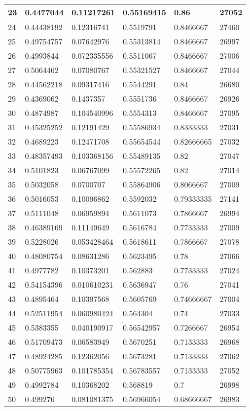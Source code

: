 \begin{longtable}{|l|l|l|l|l|l|}
23 & 0.4477044 & 0.11217261 & 0.55169415 & 0.86 & 27052 \\ \hline 
24 & 0.44438192 & 0.12316741 & 0.5519791 & 0.8466667 & 27460 \\ \hline 
25 & 0.49754757 & 0.07642976 & 0.55313814 & 0.8466667 & 26997 \\ \hline 
26 & 0.4993844 & 0.072335556 & 0.5511067 & 0.8466667 & 27006 \\ \hline 
27 & 0.5064462 & 0.07080767 & 0.55321527 & 0.8466667 & 27044 \\ \hline 
28 & 0.44562218 & 0.09317416 & 0.5544291 & 0.84 & 26680 \\ \hline 
29 & 0.4369062 & 0.1437357 & 0.5551736 & 0.8466667 & 26926 \\ \hline 
30 & 0.4874987 & 0.104540996 & 0.5554313 & 0.8466667 & 27095 \\ \hline 
31 & 0.45325252 & 0.12191429 & 0.55586934 & 0.8333333 & 27031 \\ \hline 
32 & 0.4689223 & 0.12471708 & 0.55654544 & 0.82666665 & 27032 \\ \hline 
33 & 0.48357493 & 0.103368156 & 0.55489135 & 0.82 & 27047 \\ \hline 
34 & 0.5101823 & 0.06767099 & 0.55572265 & 0.82 & 27014 \\ \hline 
35 & 0.5032058 & 0.0700707 & 0.55864906 & 0.8066667 & 27009 \\ \hline 
36 & 0.5016053 & 0.10096862 & 0.5592032 & 0.79333335 & 27141 \\ \hline 
37 & 0.5111048 & 0.06959894 & 0.5611073 & 0.7866667 & 26994 \\ \hline 
38 & 0.46389169 & 0.11149649 & 0.5616784 & 0.7733333 & 27009 \\ \hline 
39 & 0.5228026 & 0.053428464 & 0.5618611 & 0.7866667 & 27078 \\ \hline 
40 & 0.48080754 & 0.08631286 & 0.5623495 & 0.78 & 27066 \\ \hline 
41 & 0.4977782 & 0.10373201 & 0.562883 & 0.7733333 & 27024 \\ \hline 
42 & 0.54154396 & 0.010610231 & 0.5636947 & 0.76 & 27041 \\ \hline 
43 & 0.4895464 & 0.10397568 & 0.5605769 & 0.74666667 & 27004 \\ \hline 
44 & 0.52511954 & 0.060980424 & 0.564304 & 0.74 & 27033 \\ \hline 
45 & 0.5383355 & 0.040190917 & 0.56542957 & 0.7266667 & 26954 \\ \hline 
46 & 0.51709473 & 0.06583949 & 0.5670251 & 0.7133333 & 26968 \\ \hline 
47 & 0.48924285 & 0.12362056 & 0.5673281 & 0.7133333 & 27062 \\ \hline 
48 & 0.50775963 & 0.101785354 & 0.56783557 & 0.7133333 & 27052 \\ \hline 
49 & 0.4992784 & 0.10368202 & 0.568819 & 0.7 & 26998 \\ \hline 
50 & 0.499276 & 0.081081375 & 0.56966054 & 0.68666667 & 26983 \\ \hline 
\end{longtable}